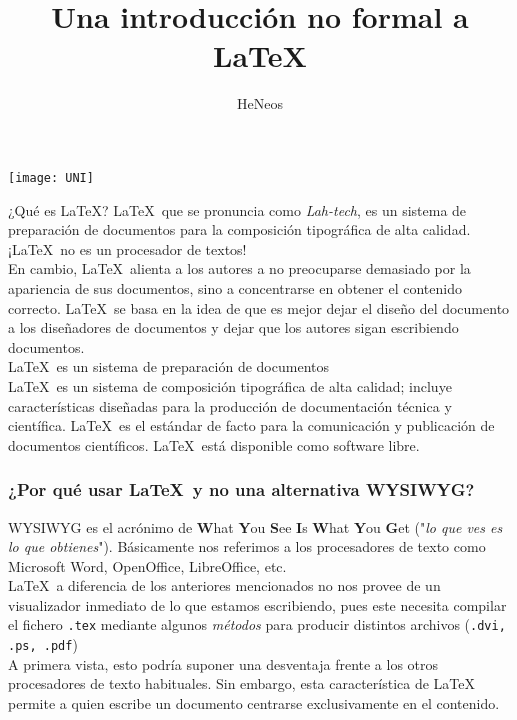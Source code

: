 \documentclass[11pt]{beamer}
\author{HeNeos}
\title{Una introducción no formal a \LaTeX}
\institute[UNI]{Universidad Nacional de Ingeniería}
\begin{document}
\begin{frame}
\texttt{[image: UNI]}
\titlepage
\end{frame}
\begin{frame}{¿Qué es \LaTeX ?}
\LaTeX \, que se pronuncia como \textit{Lah-tech}, es un sistema de preparación de documentos para la composición tipográfica de alta calidad.\\[10pt]
{\LARGE ¡\LaTeX \, no es un procesador de textos!}\\[4pt]
En cambio, \LaTeX \, alienta a los autores a no preocuparse demasiado por la apariencia de sus documentos, sino a concentrarse en obtener el contenido correcto. \LaTeX \, se basa en la idea de que es mejor dejar el diseño del documento a los diseñadores de documentos y dejar que los autores sigan escribiendo documentos.\\[10pt]
{\LARGE \LaTeX \, es un sistema de preparación de documentos}\\[4pt]
\LaTeX \, es un sistema de composición tipográfica de alta calidad; incluye características diseñadas para la producción de documentación técnica y científica. \LaTeX \, es el estándar de facto para la comunicación y publicación de documentos científicos. \LaTeX \, está disponible como software libre.
\end{frame}
\begin{frame}
\frametitle{¿Por qué usar \LaTeX \, y no una alternativa WYSIWYG?}
WYSIWYG es el acrónimo de \textbf{W}hat \textbf{Y}ou \textbf{S}ee \textbf{I}s \textbf{W}hat \textbf{Y}ou \textbf{G}et ("\!\textit{lo que ves es lo que obtienes}"). Básicamente nos referimos a los procesadores de texto como Microsoft Word, OpenOffice, LibreOffice, etc.\\[20pt]
\LaTeX \, a diferencia de los anteriores mencionados no nos provee de un visualizador inmediato de lo que estamos escribiendo, pues este necesita compilar el fichero \texttt{.tex} mediante algunos \textit{métodos} para producir distintos archivos (\texttt{.dvi, .ps, .pdf})\\[6pt]
A primera vista, esto podría suponer una desventaja frente a los otros procesadores de texto habituales. Sin embargo, esta característica de \LaTeX \, permite a quien escribe un documento centrarse exclusivamente en el contenido.
\end{frame}
\end{document}
